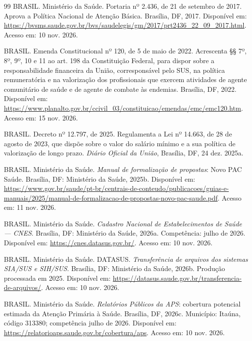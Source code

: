 \documentclass[12pt,a4paper,oneside]{report}
\begin{document}
\begin{thebibliography}{99}
BRASIL. Ministério da Saúde. Portaria nº 2.436, de 21 de setembro de 2017. Aprova a Política Nacional de Atenção Básica. Brasília, DF, 2017. Disponível em: \url{https://bvsms.saude.gov.br/bvs/saudelegis/gm/2017/prt2436_22_09_2017.html}. Acesso em: 10 nov. 2026.

BRASIL. Emenda Constitucional nº 120, de 5 de maio de 2022. Acrescenta §§ 7º, 8º, 9º, 10 e 11 ao art. 198 da Constituição Federal, para dispor sobre a responsabilidade financeira da União, corresponsável pelo SUS, na política remuneratória e na valorização dos profissionais que exercem atividades de agente comunitário de saúde e de agente de combate às endemias. Brasília, DF, 2022. Disponível em: \url{https://www.planalto.gov.br/ccivil_03/constituicao/emendas/emc/emc120.htm}. Acesso em: 15 nov. 2026.

BRASIL. Decreto nº 12.797, de 2025. Regulamenta a Lei nº 14.663, de 28 de agosto de 2023, que dispõe sobre o valor do salário mínimo e a sua política de valorização de longo prazo. \textit{Diário Oficial da União}, Brasília, DF, 24 dez. 2025a.

BRASIL. Ministério da Saúde. \textit{Manual de formalização de propostas}: Novo PAC Saúde. Brasília, DF: Ministério da Saúde, 2025b. Disponível em: \url{https://www.gov.br/saude/pt-br/centrais-de-conteudo/publicacoes/guias-e-manuais/2025/manual-de-formalizacao-de-propostas-novo-pac-saude.pdf}. Acesso em: 11 nov. 2026.

BRASIL. Ministério da Saúde. \textit{Cadastro Nacional de Estabelecimentos de Saúde --- CNES}. Brasília, DF: Ministério da Saúde, 2026a. Competência: julho de 2026. Disponível em: \url{https://cnes.datasus.gov.br/}. Acesso em: 10 nov. 2026.

BRASIL. Ministério da Saúde. DATASUS. \textit{Transferência de arquivos dos sistemas SIA/SUS e SIH/SUS}. Brasília, DF: Ministério da Saúde, 2026b. Produção processada em 2025. Disponível em: \url{https://datasus.saude.gov.br/transferencia-de-arquivos/}. Acesso em: 10 nov. 2026.

BRASIL. Ministério da Saúde. \textit{Relatórios Públicos da APS}: cobertura potencial estimada da Atenção Primária à Saúde. Brasília, DF, 2026c. Município: Itaúna, código 313380; competência julho de 2026. Disponível em: \url{https://relatorioaps.saude.gov.br/cobertura/aps}. Acesso em: 10 nov. 2026.


\end{thebibliography}
\end{document}
